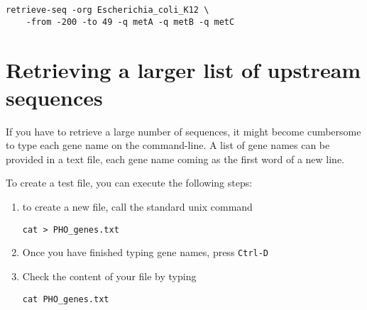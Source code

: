 {\color{Blue} \begin{footnotesize}
\begin{verbatim}
retrieve-seq -org Escherichia_coli_K12 \
    -from -200 -to 49 -q metA -q metB -q metC
\end{verbatim} \end{footnotesize}
}

\section{Retrieving a larger list of upstream sequences}

If you have to retrieve a large number of sequences, it might become
cumbersome to type each gene name on the command-line. A list of gene
names can be provided in a text file, each gene name coming as the
first word of a new line.

To create a test file, you can execute the following steps:
\begin{enumerate}
\item to create a new file, call the standard unix command 

{\color{Blue} \begin{footnotesize}
\begin{verbatim}
cat > PHO_genes.txt
\end{verbatim} \end{footnotesize}
} 


\item Once you have finished typing gene names, press \texttt{Ctrl-D}

\item Check the content of your file by typing 

{\color{Blue} \begin{footnotesize}
\begin{verbatim}
cat PHO_genes.txt
\end{verbatim} \end{footnotesize}
} 

\end{enumerate}

